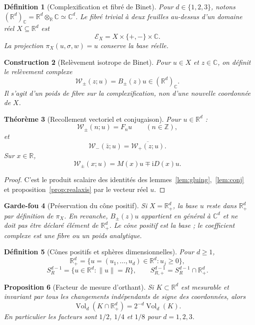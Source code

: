 \documentclass[11pt,a4paper]{article}
\newtheorem{theorem}{Théorème}[section]
\newtheorem{proposition}[theorem]{Proposition}
\newtheorem{definition}[theorem]{Définition}
\newtheorem{construction}[theorem]{Construction}
\newtheorem{guardrail}[theorem]{Garde-fou}
\newcommand{\R}{\mathbb R}
\newcommand{\C}{\mathbb C}
\newcommand{\Z}{\mathbb Z}
\newcommand{\Rp}{\mathbb R_{+}}
\newcommand{\ii}{\mathrm i}
\newcommand{\Vol}{\operatorname{Vol}}
\begin{document}
\begin{definition}[Complexification et fibré de Binet]
Pour $d\in\{1,2,3\}$, notons $(\R^d)_\C=\R^d\otimes_\R\C\simeq\C^d$. Le fibré trivial à deux feuilles au-dessus d'un domaine réel $X\subseteq\R^d$ est
\[
 \mathcal E_X=X\times\{+,-\}\times\C.
\]
La projection $\pi_X(u,\sigma,w)=u$ conserve la base réelle.
\end{definition}

\begin{construction}[Relèvement isotrope de Binet]\label{cons:lift}
Pour $u\in X$ et $z\in\C$, on définit le relèvement complexe
\[
 \mathcal W_\pm(z;u)=B_\pm(z)u\in(\R^d)_\C.
\]
Il s'agit d'un poids de fibre sur la complexification, non d'une nouvelle coordonnée de $X$.
\end{construction}

\begin{theorem}[Recollement vectoriel et conjugaison]
Pour $u\in\R^d$ :
\[
 \mathcal W_\pm(n;u)=F_nu\qquad(n\in\Z),
\]
et
\[
 \mathcal W_-(\bar z;u)=\overline{\mathcal W_+(z;u)}.
\]
Sur $x\in\R$,
\[
 \mathcal W_\pm(x;u)=M(x)u\mp\ii D(x)u.
\]
\end{theorem}

\begin{proof}
C'est le produit scalaire des identités des lemmes~\ref{lem:gluing},~\ref{lem:conj} et proposition~\ref{prop:realaxis} par le vecteur réel $u$.
\end{proof}

\begin{guardrail}[Préservation du cône positif]
Si $X=\Rp^d$, la base $u$ reste dans $\Rp^d$ par définition de $\pi_X$. En revanche, $B_\pm(z)u$ appartient en général à $\C^d$ et ne doit pas être déclaré élément de $\Rp^d$. Le cône positif est la base ; le coefficient complexe est une fibre ou un poids analytique.
\end{guardrail}

\begin{definition}[Cônes positifs et sphères dimensionnelles]
Pour $d\ge1$,
\[
 \Rp^d=\{u=(u_1,\ldots,u_d)\in\R^d:u_j\ge0\},
\]
\[
 S_R^{d-1}=\{u\in\R^d:\|u\|=R\},\qquad
 S_{R,+}^{d-1}=S_R^{d-1}\cap\Rp^d.
\]
\end{definition}

\begin{proposition}[Facteur de mesure d'orthant]\label{prop:orthant}
Si $K\subset\R^d$ est mesurable et invariant par tous les changements indépendants de signe des coordonnées, alors
\[
 \Vol_d(K\cap\Rp^d)=2^{-d}\Vol_d(K).
\]
En particulier les facteurs sont $1/2$, $1/4$ et $1/8$ pour $d=1,2,3$.
\end{proposition}
\end{document}
